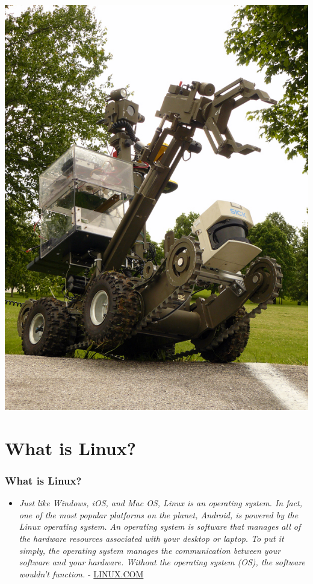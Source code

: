 \documentclass[fleqn]{beamer} %
\newcommand{\sectiontitleI}{What is Linux?} %
\begin{document}
{\begin{multicols}{2}
		\hspace*{2mm}\includegraphics[scale=0.25]{AndrosII.jpg}
		
	\end{multicols}

}

\section{\sectiontitleI}

	\begin{frame}[label=sectionI] \small
		\frametitle{\sectiontitleI}
		
\begin{itemize}
		\item {\it Just like Windows, iOS, and Mac OS, Linux is an operating system. In fact, one of the most popular platforms on the planet, Android, is powered by the Linux operating system. An operating system is software that manages all of the hardware resources associated with your desktop or laptop. To put it simply, the operating system manages the communication between your software and your hardware. Without the operating system (OS), the software wouldn't function.} - \href{https://www.linux.com/what-is-linux/}{LINUX.COM}  \vspc
        
            \end{itemize}
	\end{frame}
\end{document}
